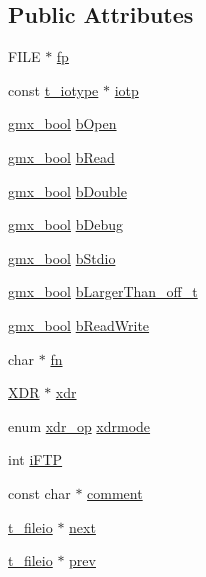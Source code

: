 \subsection*{\-Public \-Attributes}
\begin{DoxyCompactItemize}
\item 
\-F\-I\-L\-E $\ast$ \hyperlink{structt__fileio_ab2ce6988d5f81d5cab3d758cd26d5727}{fp}
\item 
const \hyperlink{structt__iotype}{t\-\_\-iotype} $\ast$ \hyperlink{structt__fileio_aa37d00c25e65b3a2ec2e67882c9f06d6}{iotp}
\item 
\hyperlink{include_2types_2simple_8h_a8fddad319f226e856400d190198d5151}{gmx\-\_\-bool} \hyperlink{structt__fileio_a00003e844767c3781604291e31c0f8cc}{b\-Open}
\item 
\hyperlink{include_2types_2simple_8h_a8fddad319f226e856400d190198d5151}{gmx\-\_\-bool} \hyperlink{structt__fileio_af6a2369ea216bf53c6a3a21fe0ef4ece}{b\-Read}
\item 
\hyperlink{include_2types_2simple_8h_a8fddad319f226e856400d190198d5151}{gmx\-\_\-bool} \hyperlink{structt__fileio_a4aed89630667f5cf17152991c4a1a8bc}{b\-Double}
\item 
\hyperlink{include_2types_2simple_8h_a8fddad319f226e856400d190198d5151}{gmx\-\_\-bool} \hyperlink{structt__fileio_a7f025d80ebd39e59fa889855f3a3f8cc}{b\-Debug}
\item 
\hyperlink{include_2types_2simple_8h_a8fddad319f226e856400d190198d5151}{gmx\-\_\-bool} \hyperlink{structt__fileio_abcab567639d5b65ff13a2403d7a2f872}{b\-Stdio}
\item 
\hyperlink{include_2types_2simple_8h_a8fddad319f226e856400d190198d5151}{gmx\-\_\-bool} \hyperlink{structt__fileio_a4010ab5aa2568a04d882ee82a82e0a6c}{b\-Larger\-Than\-\_\-off\-\_\-t}
\item 
\hyperlink{include_2types_2simple_8h_a8fddad319f226e856400d190198d5151}{gmx\-\_\-bool} \hyperlink{structt__fileio_a09835b730d342f86c0d3953623e5718e}{b\-Read\-Write}
\item 
char $\ast$ \hyperlink{structt__fileio_a3a97bb6dc2574fb1c392b59513c2e368}{fn}
\item 
\hyperlink{structXDR}{\-X\-D\-R} $\ast$ \hyperlink{structt__fileio_a66b8b7efd18d0948d0ef2baf6ecbc574}{xdr}
\item 
enum \hyperlink{include_2gmx__system__xdr_8h_a3055ce94f85d6aeec3b736d93b93a46a}{xdr\-\_\-op} \hyperlink{structt__fileio_afe7973429cc8bcda3a89fed48f544c36}{xdrmode}
\item 
int \hyperlink{structt__fileio_a516f12dad979a78aff82c1df9c6ce906}{i\-F\-T\-P}
\item 
const char $\ast$ \hyperlink{structt__fileio_aaef7e7275192eb9313c7b122ef6ed2aa}{comment}
\item 
\hyperlink{structt__fileio}{t\-\_\-fileio} $\ast$ \hyperlink{structt__fileio_a64c2b79f4928f2dfb76daa6e4378fb3b}{next}
\item 
\hyperlink{structt__fileio}{t\-\_\-fileio} $\ast$ \hyperlink{structt__fileio_a78d6ba9ce30c278a4de1c949d97c5b15}{prev}
\end{DoxyCompactItemize}


